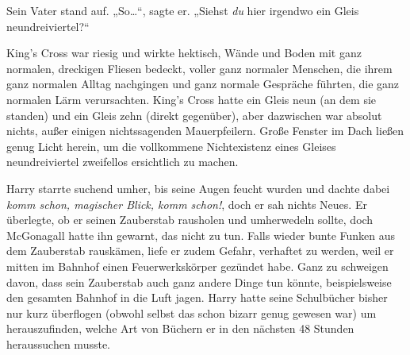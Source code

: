Sein Vater stand auf. „So…“, sagte er. „Siehst \emph{du} hier irgendwo ein Gleis neundreiviertel?“

King’s Cross war riesig und wirkte hektisch, Wände und Boden mit ganz normalen, dreckigen Fliesen bedeckt, voller ganz normaler Menschen, die ihrem ganz normalen Alltag nachgingen und ganz normale Gespräche führten, die ganz normalen Lärm verursachten. King’s Cross hatte ein Gleis neun (an dem sie standen) und ein Gleis zehn (direkt gegenüber), aber dazwischen war absolut nichts, außer einigen nichtssagenden Mauerpfeilern. Große Fenster im Dach ließen genug Licht herein, um die vollkommene Nichtexistenz eines Gleises neundreiviertel zweifellos ersichtlich zu machen.

Harry starrte suchend umher, bis seine Augen feucht wurden und dachte dabei \emph{komm schon, magischer Blick, komm schon!}, doch er sah nichts Neues. Er überlegte, ob er seinen Zauberstab rausholen und umherwedeln sollte, doch McGonagall hatte ihn gewarnt, das nicht zu tun. Falls wieder bunte Funken aus dem Zauberstab rauskämen, liefe er zudem Gefahr, verhaftet zu werden, weil er mitten im Bahnhof einen Feuerwerkskörper gezündet habe. Ganz zu schweigen davon, dass sein Zauberstab auch ganz andere Dinge tun könnte, beispielsweise den gesamten Bahnhof in die Luft jagen. Harry hatte seine Schulbücher bisher nur kurz überflogen (obwohl selbst das schon bizarr genug gewesen war) um herauszufinden, welche Art von Büchern er in den nächsten 48 Stunden heraussuchen musste.

